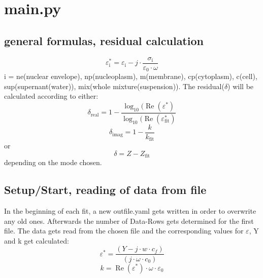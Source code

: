 \documentclass[10pt,a4paper]{article}
\renewcommand{\*}{\cdot}
\begin{document}
\section{main.py}
\subsection{general formulas, residual calculation}
\begin{equation}
\varepsilon_\mathrm{i}^\ast = \varepsilon_\mathrm{i} - j\*\frac{\sigma_\mathrm{i}}{\varepsilon_\mathrm{0}\*\omega}
\end{equation}
i = ne(nuclear envelope), np(nucleoplasm), m(membrane), cp(cytoplasm), c(cell), sup(supernant(water)), mix(whole mixture(suspension)). \newline
The residual($\delta$) will be calculated according to either: 
\begin{equation}
\delta_\mathrm{real} = 1-\frac{\log_\mathrm{10}(\operatorname{Re}(\varepsilon^\ast)}{\log_\mathrm{10}(\operatorname{Re}(\varepsilon^\ast_\mathrm{fit})}
\end{equation}
\begin{equation}
\delta_\mathrm{imag} = 1- \frac{k}{k_\mathrm{fit}}
\end{equation}
or 
\begin{equation}
\delta = Z - Z_\mathrm{fit}
\end{equation}
depending on the mode chosen. 
\subsection{Setup/Start, reading of data from file}{
In the beginning of each fit, a new outfile.yaml gets written in order to overwrite any old ones. Afterwards the number of Data-Rows gets determined for the first file. The data gets read from the chosen file and the corresponding values for $\varepsilon$, Y and k get calculated: 
\begin{equation}
\varepsilon^\ast = \frac{(Y-j\*w\*c_f)}{(j\*\omega\*c_0)} 
\end{equation}
\begin{equation}
k = \operatorname{Re}(\varepsilon^\ast) \* \omega \* \varepsilon_{\mathrm{0}}
\end{equation}
}
\end{document}
